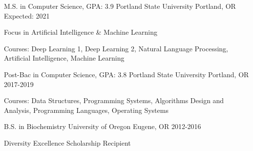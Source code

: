 
\begin{cventries}
  \cventry
    {M.S. in Computer Science, GPA: 3.9} %
    {Portland State University} %
    {Portland, OR} %
    {Expected: 2021} %
    {
      \begin{cvitems} %
         \item {Focus in Artificial Intelligence \& Machine Learning}
         \item {Courses: Deep Learning 1, Deep Learning 2, Natural Language Processing, Artificial Intelligence, Machine Learning}
      \end{cvitems}
    }

  \cventry
  {Post-Bac in Computer Science, GPA: 3.8}
  {Portland State University}
  {Portland, OR}
  {2017-2019}
  {
    \begin{cvitems} %
    \item {Courses: Data Structures, Programming Systems, Algorithms Design and Analysis, Programming Languages, Operating Systems}
    \end{cvitems}
  }


  \cventry
  {B.S. in Biochemistry}
  {University of Oregon}
  {Eugene, OR}
  {2012-2016}
  {
      \begin{cvitems} %
         \item {Diversity Excellence Scholarship Recipient}
      \end{cvitems}
  }

\end{cventries}
